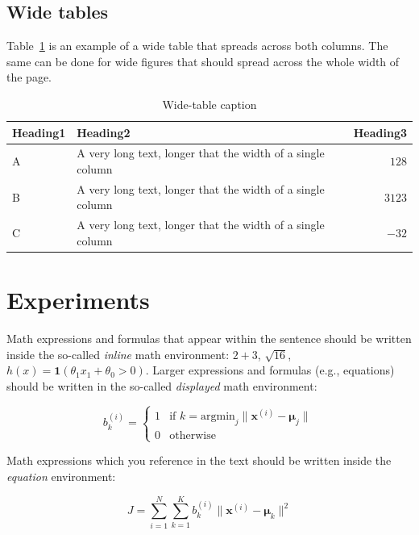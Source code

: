 \documentclass[10pt, a4paper]{article}
\begin{document}
\subsection{Wide tables}

Table~\ref{tab:wide-table} is an example of a wide table that spreads across both columns. The same can be done for wide figures that should spread across the whole width of the page. 

\begin{table}
\caption{Wide-table caption}
\label{tab:wide-table}
\begin{center}
\begin{tabular}{llr}
\toprule
Heading1 & Heading2 & Heading3\\
\midrule
A & A very long text, longer that the width of a single column & $128$\\
B & A very long text, longer that the width of a single column & $3123$\\
C & A very long text, longer that the width of a single column & $-32$\\
\bottomrule
\end{tabular}
\end{center}
\end{table}

\section{Experiments}

Math expressions and formulas that appear within the sentence should be written inside the so-called \emph{inline} math environment: $2+3$, $\sqrt{16}$, $h(x)=\mathbf{1}(\theta_1 x_1 + \theta_0>0)$. Larger expressions and formulas (e.g., equations) should be written in the so-called \emph{displayed} math environment:

\[
b^{(i)}_k = \begin{cases}
1 & \text{if 
    $k = \text{argmin}_j \| \mathbf{x}^{(i)} - \mathbf{\mu}_j \|$}\\
0 & \text{otherwise}
\end{cases}
\]

Math expressions which you reference in the text should be written inside the \textit{equation} environment:

\begin{equation}\label{eq:kmeans-error}
J = \sum_{i=1}^N \sum_{k=1}^K 
b^{(i)}_k \| \mathbf{x}^{(i)} - \mathbf{\mu}_k \|^2
\end{equation}
\end{document}

